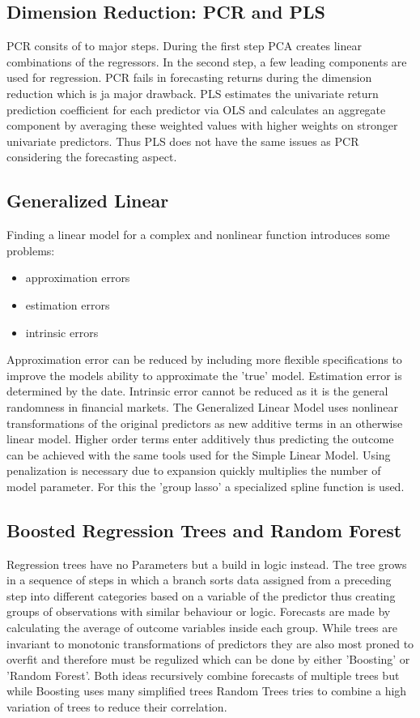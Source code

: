 \subsection{Dimension Reduction: PCR and PLS}
	PCR consits of to major steps. During the first step PCA creates linear combinations
	of the regressors. In the second step, a few leading components are used for regression.
	PCR fails in forecasting returns during the dimension reduction which is ja major drawback.
	\newline
	PLS estimates the univariate return prediction coefficient for each predictor via OLS
	and calculates an aggregate component by averaging these weighted values
	with higher weights on stronger univariate predictors. Thus PLS does not have the
	same issues as PCR considering the forecasting aspect.

\subsection{Generalized Linear}
	Finding a linear model for a complex and nonlinear function introduces some problems:
	\begin{itemize}
		\item approximation errors
		\item estimation errors
		\item intrinsic errors
	\end{itemize}
	Approximation error can be reduced by including more flexible specifications to improve the
	models ability to approximate the 'true' model.
	Estimation error is determined by the date.
	Intrinsic error cannot be reduced as it is the general randomness in financial markets.
	The Generalized Linear Model uses nonlinear transformations of the original predictors as new
	additive terms in an otherwise linear model.
	Higher order terms enter additively thus predicting the outcome can be achieved with the same
	tools used for the Simple Linear Model.
	Using penalization is necessary due to expansion quickly multiplies the number of model parameter.
	For this the 'group lasso' a specialized spline function is used.

\subsection{Boosted Regression Trees and Random Forest}
	Regression trees have no Parameters but a build in logic instead.
	The tree grows in a sequence of steps in which a branch sorts data assigned from
	a preceding step into different categories based on a variable of the predictor
	thus creating groups of observations with similar behaviour or logic.
	Forecasts are made by calculating the average of outcome variables inside each group.
	While trees are invariant to monotonic transformations of predictors they are
	also most proned to overfit and therefore must be regulized which can be done
	by either 'Boosting' or 'Random Forest'. Both ideas recursively combine
	forecasts of multiple trees but while Boosting uses many simplified trees
	Random Trees tries to combine a high variation of trees to reduce their correlation.


